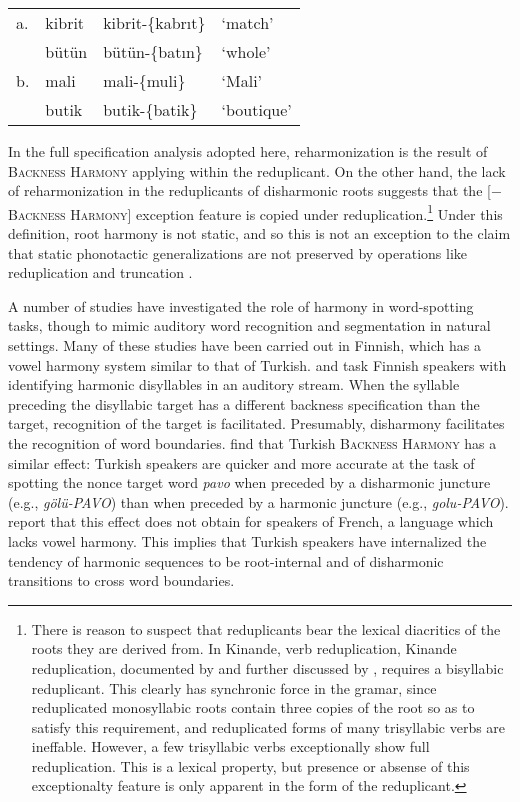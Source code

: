 \begin{example} 
\label{redupgame}
\begin{tabular}{llll}
a. & {kibrit} & {kibrit}-\{{kabrıt}\} & `match'    \\
   & {bütün}  & {bütün}-\{{batın}\}   & `whole'    \\
b. & {mali}   & {mali}-\{{muli}\}     & `Mali'     \\
   & {butik}  & {butik}-\{{batik}\}   & `boutique' \\
\end{tabular}
\end{example}

\noindent 
In the full specification analysis adopted here, reharmonization is the result of \textsc{Backness Harmony} applying within the reduplicant. 
    On the other hand, the lack of reharmonization in the reduplicants of disharmonic roots suggests that the [$-$\textsc{Backness Harmony}] exception feature is copied under reduplication.\footnote{
    There is reason to suspect that reduplicants bear the lexical diacritics of the roots they are derived from.
    In Kinande, verb reduplication, 
    Kinande reduplication, documented by \citet{Mutaka1990} and further discussed by \citet{Downing2000}, requires a bisyllabic reduplicant. 
    This clearly has synchronic force in the gramar, since reduplicated monosyllabic roots contain three copies of the root so as to satisfy this requirement, and reduplicated forms of many trisyllabic verbs are ineffable. 
    However, a few trisyllabic verbs exceptionally show full reduplication.
    This is a lexical property, but presence or absense of this exceptionalty feature is only apparent in the form of the reduplicant.}
    Under this definition, root harmony is not static, and so this is not an exception to the claim that static phonotactic generalizations are not preserved by operations like reduplication and truncation \citep{Silverman2000}.

A number of studies have investigated the role of harmony in word-spotting tasks, though to mimic auditory word recognition and segmentation in natural settings. 
    Many of these studies have been carried out in Finnish, which has a vowel harmony system similar to that of Turkish. 
    \citet{Suomi1997} and \citet{Vroomen1998} task Finnish speakers with identifying harmonic disyllables in an auditory stream. 
    When the syllable preceding the disyllabic target has a different backness specification than the target, recognition of the target is facilitated. Presumably, disharmony facilitates the recognition of word boundaries. 
    \citet{Kabak2010} find that Turkish \textsc{Backness Harmony} has a similar effect: Turkish speakers are quicker and more accurate at the task of spotting the nonce target word \emph{pavo} when preceded by a disharmonic juncture (e.g., \emph{gölü-PAVO}) than when preceded by a harmonic juncture (e.g., \emph{golu-PAVO}). 
    \citeauthor{Kabak2010} report that this effect does not obtain for speakers of French, a language which lacks vowel harmony. 
    This implies that Turkish speakers have internalized the tendency of harmonic sequences to be root-internal and of disharmonic transitions to cross word boundaries. 

